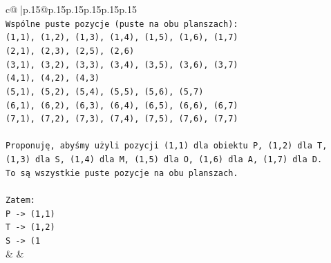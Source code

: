 \documentclass{article}
\begin{document}
{\begin{supertabular}{c@{$\;$}|p{.15\linewidth}@{}p{.15\linewidth}p{.15\linewidth}p{.15\linewidth}p{.15\linewidth}p{.15\linewidth}}
{{{\\ 
\texttt{Wspólne puste pozycje (puste na obu planszach):} \\
\texttt{(1,1), (1,2), (1,3), (1,4), (1,5), (1,6), (1,7)} \\
\texttt{(2,1), (2,3), (2,5), (2,6)} \\
\texttt{(3,1), (3,2), (3,3), (3,4), (3,5), (3,6), (3,7)} \\
\texttt{(4,1), (4,2), (4,3)} \\
\texttt{(5,1), (5,2), (5,4), (5,5), (5,6), (5,7)} \\
\texttt{(6,1), (6,2), (6,3), (6,4), (6,5), (6,6), (6,7)} \\
\texttt{(7,1), (7,2), (7,3), (7,4), (7,5), (7,6), (7,7)} \\
\\ 
\texttt{Proponuję, abyśmy użyli pozycji (1,1) dla obiektu P, (1,2) dla T, (1,3) dla S, (1,4) dla M, (1,5) dla O, (1,6) dla A, (1,7) dla D.} \\
\texttt{To są wszystkie puste pozycje na obu planszach.} \\
\\ 
\texttt{Zatem:} \\
\texttt{P {-}> (1,1)} \\
\texttt{T {-}> (1,2)} \\
\texttt{S {-}> (1} \\
            }
        }
    }
    & & \\ \\


\end{supertabular}}
\end{document}
